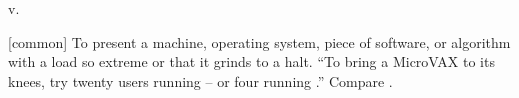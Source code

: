  v.

[common] To present a machine, operating system, piece of software, or algorithm
with a load so extreme or  that it grinds to a halt.
``To bring a MicroVAX to its knees, try twenty users running  --
or four running .'' Compare .

